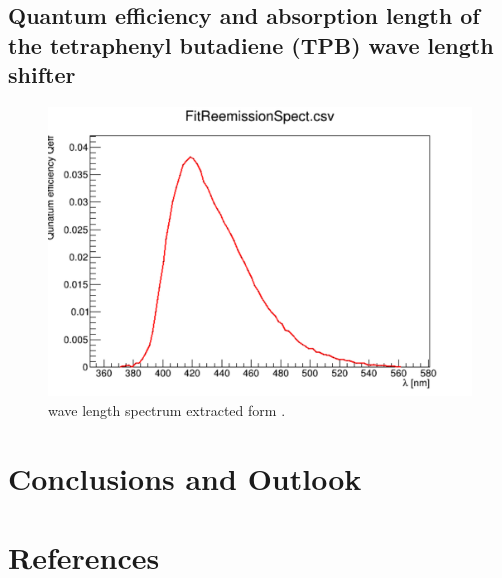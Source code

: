 \documentclass[a4paper]{jpconf}
\begin{document}
\subsection{Quantum efficiency and absorption length of the tetraphenyl butadiene (TPB) wave length shifter}
\cite{ref:wls}
\begin{figure}[ht]
\begin{center}
\includegraphics[width=35.5pc]{wls.pdf}
\end{center}
\caption{\label{fig:wls}wave length spectrum extracted form \cite{ref:wls}.}
\end{figure}

\section{Conclusions and Outlook}
\clearpage
 \section*{References}
\end{document}
